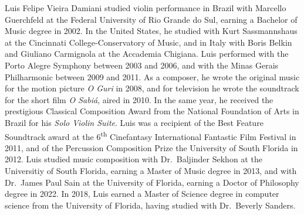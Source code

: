 Luis Felipe Vieira Damiani studied violin performance in Brazil with Marcello Guerchfeld at the Federal University of Rio Grande do Sul, earning a Bachelor of Music degree in 2002. In the United States, he studied with Kurt Sassmannshaus at the Cincinnati College-Conservatory of Music, and in Italy with Boris Belkin and Giuliano Carmignola at the Accademia Chigiana. Luis performed with the Porto Alegre Symphony between 2003 and 2006, and with the Minas Gerais Philharmonic between 2009 and 2011. As a composer, he wrote the original music for the motion picture \emph{O Guri} in 2008, and for television he wrote the soundtrack for the short film \emph{O Sabi\'a}, aired in 2010. In the same year, he received the prestigious Classical Composition Award from the National Foundation of Arts in Brazil for his \emph{Solo Violin Suite}. Luis was a recipient of the Best Feature Soundtrack award at the 6\textsuperscript{th} Cinefantasy International Fantastic Film Festival in 2011, and of the Percussion Composition Prize the University of South Florida in 2012. Luis studied music composition with Dr.~Baljinder Sekhon at the Universitiy of South Florida, earning a Master of Music degree in 2013, and with Dr.~James Paul Sain at the University of Florida, earning a Doctor of Philosophy degree in 2022. In 2018, Luis earned a Master of Science degree in computer science from the University of Florida, having studied with Dr.~Beverly Sanders.
